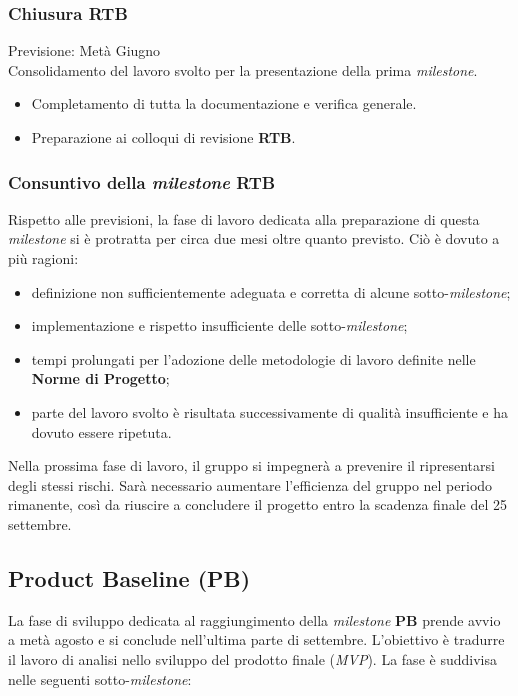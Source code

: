 \documentclass[12pt, a4paper]{article}
\begin{document}
{\subsubsection{Chiusura \textbf{RTB}}
Previsione: Metà Giugno \\
Consolidamento del lavoro svolto per la presentazione della prima \textit{milestone}.
\begin{itemize}
    \item Completamento di tutta la documentazione e verifica generale.
\item Preparazione ai colloqui di revisione \textbf{RTB}.
\end{itemize}


\subsubsection{Consuntivo della \textit{milestone} RTB}

Rispetto alle previsioni, la fase di lavoro dedicata alla preparazione di questa \textit{milestone} si è protratta per circa due mesi oltre quanto previsto. Ciò è dovuto a più ragioni:

\begin{itemize}
    \item definizione non sufficientemente adeguata e corretta di alcune sotto-\textit{milestone};

    \item implementazione e rispetto insufficiente delle sotto-\textit{milestone};

    \item tempi prolungati per l'adozione delle metodologie di lavoro definite nelle \textbf{Norme di Progetto};

    \item parte del lavoro svolto è risultata successivamente di qualità insufficiente e ha dovuto essere ripetuta.
\end{itemize}

Nella prossima fase di lavoro, il gruppo si impegnerà a prevenire il ripresentarsi degli stessi rischi. Sarà necessario aumentare l'efficienza del gruppo nel periodo rimanente, così da riuscire a concludere il progetto entro la scadenza finale del 25 settembre.


\subsection{Product Baseline (PB)}
La fase di sviluppo dedicata al raggiungimento della \textit{milestone} \textbf{PB} prende avvio a metà agosto e si conclude nell'ultima parte di settembre. L'obiettivo è tradurre il lavoro di analisi nello sviluppo del prodotto finale (\textit{MVP}). La fase è suddivisa nelle seguenti sotto-\textit{milestone}:

}
\end{document}
